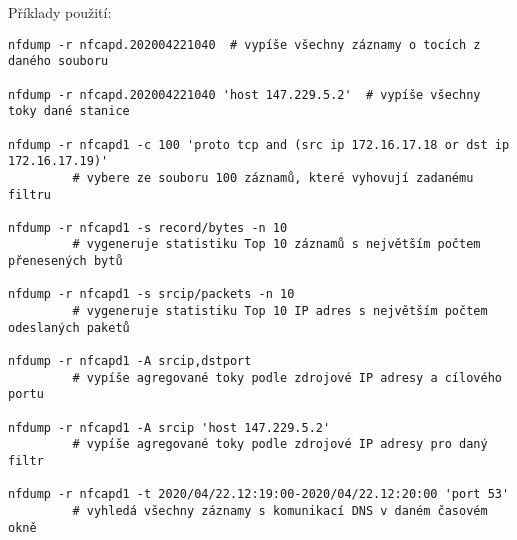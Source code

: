 Příklady použití:
\begin{verbatim}
nfdump -r nfcapd.202004221040  # vypíše všechny záznamy o tocích z daného souboru

nfdump -r nfcapd.202004221040 'host 147.229.5.2'  # vypíše všechny toky dané stanice
 
nfdump -r nfcapd1 -c 100 'proto tcp and (src ip 172.16.17.18 or dst ip 172.16.17.19)'
         # vybere ze souboru 100 záznamů, které vyhovují zadanému filtru

nfdump -r nfcapd1 -s record/bytes -n 10
         # vygeneruje statistiku Top 10 záznamů s největším počtem přenesených bytů

nfdump -r nfcapd1 -s srcip/packets -n 10
         # vygeneruje statistiku Top 10 IP adres s největším počtem odeslaných paketů

nfdump -r nfcapd1 -A srcip,dstport
         # vypíše agregované toky podle zdrojové IP adresy a cílového portu

nfdump -r nfcapd1 -A srcip 'host 147.229.5.2'
         # vypíše agregované toky podle zdrojové IP adresy pro daný filtr

nfdump -r nfcapd1 -t 2020/04/22.12:19:00-2020/04/22.12:20:00 'port 53'
         # vyhledá všechny záznamy s komunikací DNS v daném časovém okně 
\end{verbatim}

